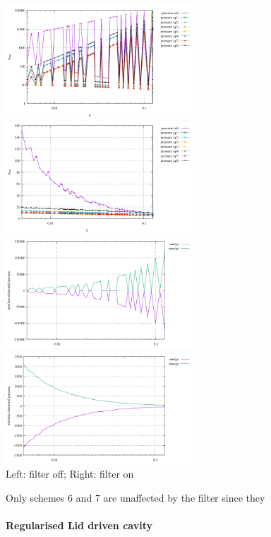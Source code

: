 \begin{center}
\includegraphics[width=7cm]{python_codes/fieldstone_12/results/ldc/prms_nofilter}
\includegraphics[width=7cm]{python_codes/fieldstone_12/results/ldc/prms_filter}\\
\includegraphics[width=7cm]{python_codes/fieldstone_12/results/ldc/rawp_nofilter}
\includegraphics[width=7cm]{python_codes/fieldstone_12/results/ldc/rawp_filter}\\
{\captionfont Left: filter off; Right: filter on}
\end{center}

Only schemes 6 and 7 are unaffected by the filter since they 


\paragraph{Regularised Lid driven cavity}

